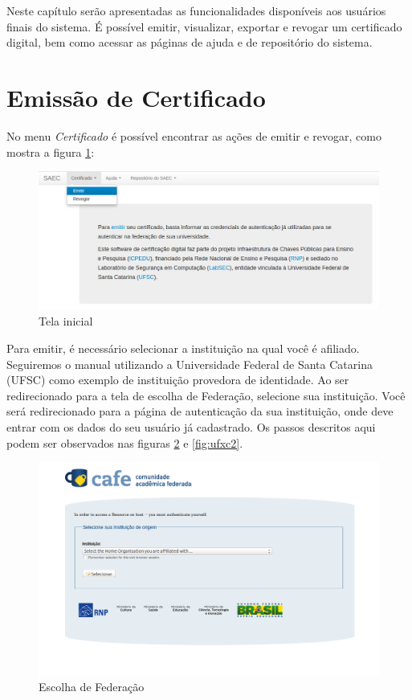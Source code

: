 Neste capítulo serão apresentadas as funcionalidades disponíveis aos usuários finais do sistema.
 É possível emitir, visualizar, exportar e revogar um certificado digital, bem como acessar as páginas de ajuda e de repositório do sistema.

\section{Emissão de Certificado}

No menu \textit{Certificado} é possível encontrar as ações de emitir e revogar, como mostra a figura \ref{fig:emirevog}:

\begin{figure}[ht]
     \centering
     \includegraphics[scale=0.4]{images/emitir1.png}
     \caption{Tela inicial}
     \label{fig:emirevog}
\end{figure}

Para emitir, é necessário selecionar a instituição na qual você é afiliado. Seguiremos o manual utilizando a Universidade Federal de Santa Catarina (UFSC) como exemplo de instituição provedora de identidade. Ao ser redirecionado para a tela de escolha de Federação, selecione sua instituição. Você será redirecionado para a página de autenticação da sua instituição, onde deve entrar com os dados do seu usuário já cadastrado. Os passos descritos aqui podem ser observados nas figuras \ref{fig:ufxc} e \ref{fig:ufxc2}.

\begin{figure}[ht]
     \centering
     \includegraphics[scale=0.3]{images/escolher-federacao.png}
     \caption{Escolha de Federação}
     \label{fig:ufxc}
\end{figure}

